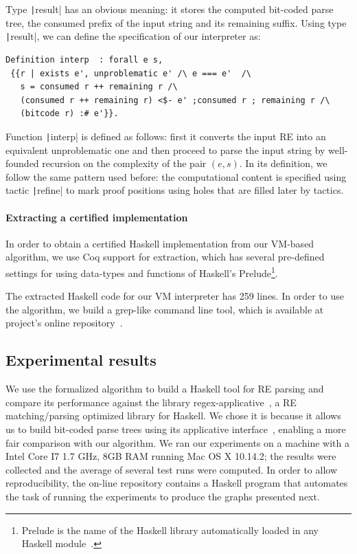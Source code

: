 \documentclass[oneside,12pt]{scrbook}
\theoremstyle{definition}
\newcommand{\coq}[1]{\texttt|#1|}
\theoremstyle{plain}
\theoremstyle{definition}
\begin{document}
Type \coq{result} has an obvious meaning: it stores the computed bit-coded parse
tree, the consumed prefix of the input string and its remaining suffix. Using
type \coq{result}, we can define the specification of our interpreter as:

\begin{verbatim}
Definition interp  : forall e s,
 {{r | exists e', unproblematic e' /\ e === e'  /\
   s = consumed r ++ remaining r /\
   (consumed r ++ remaining r) <$- e' ;consumed r ; remaining r /\
   (bitcode r) :# e'}}. 
\end{verbatim}
Function \coq{interp} is defined as follows: first it converts the input RE into
an equivalent unproblematic one and then proceed to parse the input string by
well-founded recursion on the complexity of the pair $(e,s)$. In its definition,
we follow the same pattern used before: the computational content is specified
using tactic \coq{refine} to mark proof positions using holes that are filled
later by tactics.

\paragraph{Extracting a certified implementation}

In order to obtain a certified Haskell implementation from our VM-based algorithm,
we use Coq support for extraction, which has several pre-defined
settings for using data-types and functions of Haskell's
Prelude\footnote{Prelude is the name of the Haskell library automatically loaded
in any Haskell module~\cite{Haskell98}.}.

The extracted Haskell code for our VM interpreter has 259 lines. In order to use 
the algorithm, we build a grep-like command line tool, which is available at 
project's online repository~\cite{regexvm-rep}. 

\subsection{Experimental results}\label{subsection:bigstepexperiments}

We use the formalized algorithm to build a Haskell tool for RE parsing and
compare its performance against the library
regex-applicative~\cite{regex-applicative},  a RE
matching/parsing optimized library for Haskell. We chose it is because it allows us to 
build bit-coded parse trees using its applicative interface~\cite{Mcbride2008},
enabling a more fair comparison with our algorithm.
We ran our experiments on a machine with a Intel Core I7 1.7 GHz, 8GB RAM 
running Mac OS X 10.14.2; the results were collected and the average of several 
test runs were computed. In order to allow reproducibility, the on-line
repository contains a Haskell program that automates the task of running the 
experiments to produce the graphs presented next.
\end{document}
